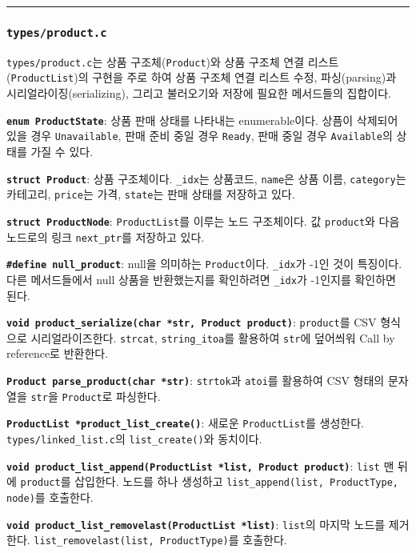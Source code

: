 \documentclass[runningheads]{llncs}
\begin{document}
\noindent\rule{2cm}{0.4pt}

\subsubsection{\texttt{types/product.c}}
\texttt{types/product.c}는 상품 구조체(\texttt{Product})와 상품 구조체 연결 리스트(\texttt{ProductList})의 구현을 주로 하여 상품 구조체 연결 리스트 수정, 파싱(parsing)과 시리얼라이징(serializing), 그리고 불러오기와 저장에 필요한 메서드들의 집합이다.

\textbf{\texttt{enum ProductState}}: 상품 판매 상태를 나타내는 enumerable이다. 상픔이 삭제되어 있을 경우 \texttt{Unavailable}, 판매 준비 중일 경우 \texttt{Ready}, 판매 중일 경우 \texttt{Available}의 상태를 가질 수 있다.

\textbf{\texttt{struct Product}}: 상품 구조체이다. \texttt{_idx}는 상품코드, \texttt{name}은 상품 이름, \texttt{category}는 카테고리, \texttt{price}는 가격, \texttt{state}는 판매 상태를 저장하고 있다.

\textbf{\texttt{struct ProductNode}}: \texttt{ProductList}를 이루는 노드 구조체이다. 값 \texttt{product}와 다음 노드로의 링크 \texttt{next_ptr}를 저장하고 있다.

\textbf{\texttt{\#define null_product}}: null을 의미하는 \texttt{Product}이다. \texttt{_idx}가 -1인 것이 특징이다. 다른 메서드들에서 null 상품을 반환했는지를 확인하려면 \texttt{_idx}가 -1인지를 확인하면 된다.

\textbf{\texttt{void product_serialize(char *str, Product product)}}: \texttt{product}를 CSV 형식으로 시리얼라이즈한다. \texttt{strcat}, \texttt{string_itoa}를 활용하여 \texttt{str}에 덮어씌워 Call by reference로 반환한다.

\textbf{\texttt{Product parse_product(char *str)}}: \texttt{strtok}과 \texttt{atoi}를 활용하여 CSV 형태의 문자열을 \texttt{str}을 \texttt{Product}로 파싱한다. 

\textbf{\texttt{ProductList *product_list_create()}}: 새로운 \texttt{ProductList}를 생성한다. \texttt{types/linked_list.c}의 \texttt{list_create()}와 동치이다.

\textbf{\texttt{void product_list_append(ProductList *list, Product product)}}: \texttt{list} 맨 뒤에 \texttt{product}를 삽입한다. 노드를 하나 생성하고 \texttt{list_append(list, ProductType, node)}를 호출한다.

\textbf{\texttt{void product_list_removelast(ProductList *list)}}: \texttt{list}의 마지막 노드를 제거한다. \texttt{list_removelast(list, ProductType)}를 호출한다.
\end{document}
